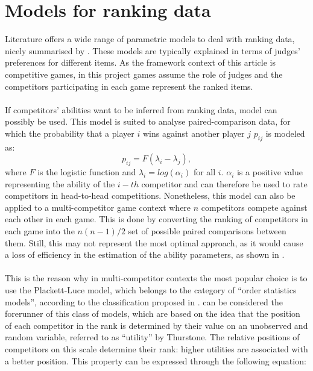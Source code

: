 \section{Models for ranking data}
Literature offers a wide range of parametric models to deal with ranking data, nicely summarised by \cite{critchlow1991probability}. These models are typically explained in terms of judges' preferences for different items. As the framework context of this article is competitive games, in this project games assume the role of judges and the competitors participating in each game represent the ranked items.\\
\\
If competitors' abilities want to be inferred from ranking data,\cite{bradley1952rank} model can possibly be used. This model is suited to analyse paired-comparison data, for which the probability that a player $i$ wins against another player $j$ $p_{ij}$  is modeled as: 
\begin{equation*}
p_{ij} = F(\lambda_{i}-\lambda_{j}),
\end{equation*}
where $F$ is the logistic function and $\lambda_{i}=log⁡(\alpha_{i})$ for all $i$. $\alpha_{i}$ is a positive value representing the ability of the $i-th$ competitor and can therefore be used to rate competitors in head-to-head competitions. Nonetheless, this model can also be applied to a multi-competitor game context where $n$ competitors compete against each other in each game. This is done by converting the ranking of competitors in each game into the $n(n-1)/2$ set of possible paired comparisons between them. Still, this may not represent the most optimal approach, as it would cause a loss of efficiency in the estimation of the ability parameters, as shown in \cite{zhang2021building}.\\
\\
This is the reason why in multi-competitor contexts the most popular choice is to use the Plackett-Luce model, which belongs to the category of “order statistics models”, according to the classification proposed in \cite{critchlow1991probability}.
\cite{thurstone1927law} can be considered the forerunner of this class of models, which are based on the idea that the position of each competitor in the rank is determined by their value on an unobserved and random variable, referred to as “utility” by Thurstone. The relative positions of competitors on this scale determine their rank: higher utilities are associated with a better position. This property can be expressed through the following equation:
